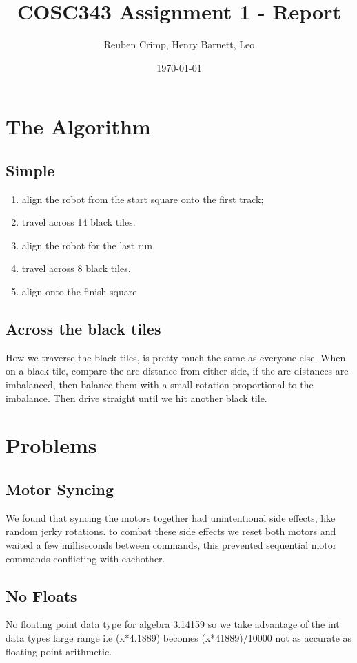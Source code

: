 \documentclass[a4paper,11pt]{article}
\title{COSC343 Assignment 1 - Report}
\author{Reuben Crimp, Henry Barnett, Leo}
\date{\today}
\begin{document}
\maketitle
\section {The Algorithm}

\subsection{Simple}
\begin{enumerate}
\item align the robot from the start square onto the first track;
\item travel across 14 black tiles.
\item align the robot for the last run
\item travel across 8 black tiles.
\item align onto the finish square
\end{enumerate}

\subsection{Across the black tiles}
How we traverse the black tiles, is pretty much the same as everyone else.
When on a black tile, compare the arc distance from either side, if the arc distances are imbalanced, then balance them with a small rotation proportional to the imbalance.
Then drive straight until we hit another black tile.

\section {Problems}

\subsection{Motor Syncing}
We found that syncing the motors together had unintentional side effects, like random jerky rotations. to combat these side effects we reset both motors and waited a few milliseconds between commands, this prevented sequential motor commands conflicting with eachother.

\subsection{No Floats}
No floating point data type for algebra 3.14159
so we take advantage of the int data types large range
i.e (x*4.1889) becomes (x*41889)/10000
not as accurate as floating point arithmetic.
\end{document}
